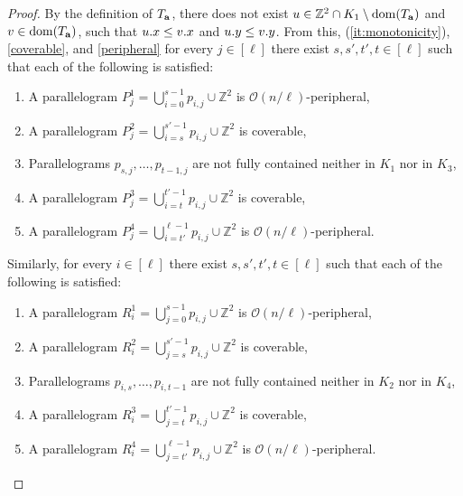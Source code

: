 \documentclass[11pt, letterpaper]{article}
\theoremstyle{plain}
\theoremstyle{definition}
\theoremstyle{remark}
\newcommand{\Z}{\mathbb{Z}}
\renewcommand{\O}{\mathcal{O}}
\begin{document}
\begin{proof}
By the definition of $T_\mathbf{a}$, there does not exist $u \in \Z^2 \cap K_1 \setminus \d{\Ta}$ and $v \in \operatorname*{dom}(T_\mathbf{a})$, such that $u.x \le v.x$ and $u.y \le v.y$. From this, (\ref{it:monotonicity}), \cref{coverable}, and \cref{peripheral} for every $j \in [\ell]$ there exist $s,s', t',t \in [\ell]$  such that each of the following is satisfied:
\begin{enumerate}
	\item A parallelogram $P_j^1 = \bigcup_{i=0}^{s-1} p_{i, j} \cup \Z^2$ is $\O(n/\ell)$-peripheral,
	\item A parallelogram $P_j^2 = \bigcup_{i=s}^{s'-1} p_{i, j} \cup \Z^2$ is coverable, 
	\item Parallelograms $p_{s, j}, \dots, p_{t - 1, j}$ are not fully contained neither in $K_1$ nor in $K_3$,
	\item A parallelogram $P_j^3 = \bigcup_{i=t}^{t'-1} p_{i, j} \cup \Z^2$ is coverable,
	\item A parallelogram $P_j^4 = \bigcup_{i=t'}^{\ell - 1} p_{i, j} \cup \Z^2$ is $\O(n/\ell)$-peripheral.
\end{enumerate}

\noindent Similarly, for every $i \in [\ell]$ there exist $s,s', t',t \in [\ell]$  such that each of the following is satisfied:
\begin{enumerate}
	\item A parallelogram $R_i^1 = \bigcup_{j=0}^{s-1} p_{i, j} \cup \Z^2$ is $\O(n/\ell)$-peripheral,
	\item A parallelogram $R_i^2 = \bigcup_{j=s}^{s'-1} p_{i, j} \cup \Z^2$ is coverable, 
	\item Parallelograms $p_{i, s}, \dots, p_{i, t-1}$ are not fully contained neither in $K_2$ nor in $K_4$,
	\item A parallelogram $R_i^3 = \bigcup_{j=t}^{t'-1} p_{i, j} \cup \Z^2$ is coverable,
	\item A parallelogram $R_i^4 = \bigcup_{j=t'}^{\ell - 1} p_{i, j} \cup \Z^2$ is $\O(n/\ell)$-peripheral. 
\end{enumerate}


\end{proof}
\end{document}
